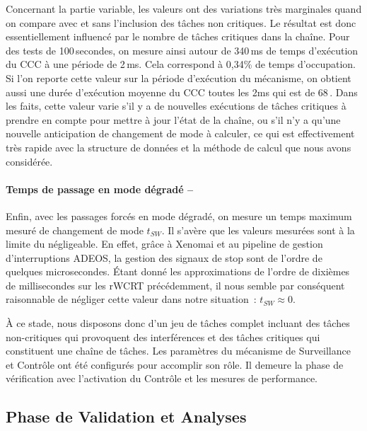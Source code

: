 \documentclass[french, a4paper, 11pt, twoside, pdftex]{StyleThese}
\begin{document}
Concernant la partie variable, les valeurs ont des variations très marginales quand on compare avec et sans l'inclusion des tâches non critiques. Le résultat est donc essentiellement influencé par le nombre de tâches critiques dans la chaîne. Pour des tests de 100\,secondes, on mesure ainsi autour de 340\,ms de temps d'exécution du CCC à une période de 2\,ms. Cela correspond à 0,34\% de temps d'occupation. Si l'on reporte cette valeur sur la période d'exécution du mécanisme, on obtient aussi une durée d'exécution moyenne du CCC toutes les 2ms qui est de 68\,. Dans les faits, cette valeur varie s'il y a de nouvelles exécutions de tâches critiques à prendre en compte pour mettre à jour l'état de la chaîne, ou s'il n'y a qu'une nouvelle anticipation de changement de mode à calculer, ce qui est effectivement très rapide avec la structure de données et la méthode de calcul que nous avons considérée.

\paragraph{Temps de passage en mode dégradé -- }Enfin, avec les passages forcés en mode dégradé, on mesure un temps maximum mesuré de changement de mode $t_{SW}$. Il s'avère que les valeurs mesurées sont à la limite du négligeable. En effet, grâce à Xenomai et au pipeline de gestion d'interruptions ADEOS, la gestion des signaux de stop sont de l'ordre de quelques microsecondes. Étant donné les approximations de l'ordre de dixièmes de millisecondes sur les rWCRT précédemment, il nous semble par conséquent raisonnable de négliger cette valeur dans notre situation~: $t_{SW} \approx 0$. 

À ce stade, nous disposons donc d'un jeu de tâches complet incluant des tâches non-critiques qui provoquent des interférences et des tâches critiques qui constituent une chaîne de tâches. Les paramètres du mécanisme de Surveillance et Contrôle ont été configurés pour accomplir son rôle. Il demeure la phase de vérification avec l'activation du Contrôle et les mesures de performance. 



\subsection{Phase de Validation et Analyses}
\end{document}
